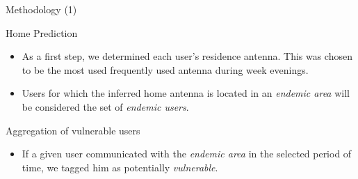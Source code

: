 \documentclass{beamer}
\begin{document}


\begin{frame}{Methodology (1)}

	\begin{block}{Home Prediction}
		\begin{itemize}
			\item As a first step, we determined each user's residence antenna. This was chosen to be the most used frequently used antenna during week evenings.



			\item Users for which the inferred home antenna is located in an \textit{endemic area} will
			be considered the set of \textit{endemic users}.

		\end{itemize}
	\end{block}
	\pause
	\begin{block}{Aggregation of vulnerable users}
		\begin{itemize}

			\item If a given user communicated with the \textit{endemic area} in the selected period of time, we tagged him as potentially \textit{vulnerable}.


\end{itemize}
\end{block}
\end{frame}
\end{document}
